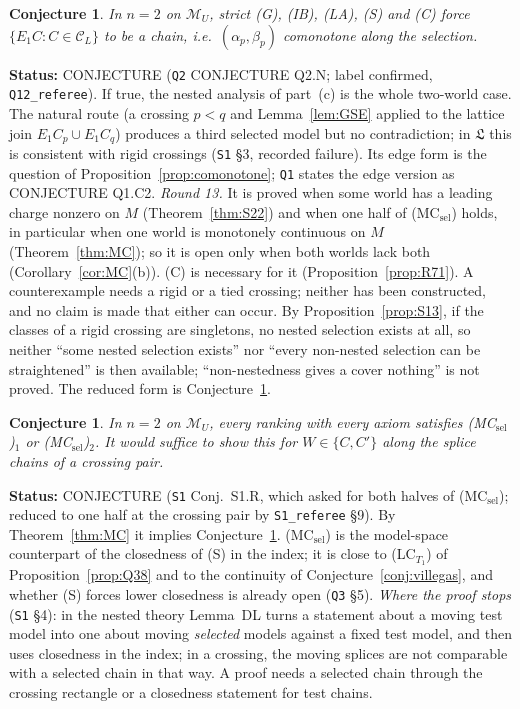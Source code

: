 \documentclass[11pt]{article}
\newtheorem{conjecture}[theorem]{Conjecture}
\theoremstyle{definition}
\theoremstyle{remark}
\newcommand{\M}{\mathcal M}
\newcommand{\C}{\mathcal C}
\newcommand{\src}[1]{\texttt{#1}}
\newcommand{\status}[1]{\par\smallskip\noindent\textbf{Status:} #1\par\smallskip}
\begin{document}
\begin{conjecture}\label{conj:Q2N}
In $n=2$ on $\M_U$, strict (G), (IB), (LA), (S) and (C) force $\{E_1C:C\in\C_L\}$ to be a chain, i.e.\ $(\alpha_p,\beta_p)$ comonotone along the selection.
\end{conjecture}
\status{CONJECTURE (\src{Q2} CONJECTURE Q2.N; label confirmed, \src{Q12\_referee}). If true, the nested analysis of part~(c) is the whole two-world case. The natural route (a crossing $p<q$ and Lemma~\ref{lem:GSE} applied to the lattice join $E_1C_p\cup E_1C_q$) produces a third selected model but no contradiction; in $\mathfrak L$ this is consistent with rigid crossings (\src{S1} \S3, recorded failure). Its edge form is the question of Proposition~\ref{prop:comonotone}; \src{Q1} states the edge version as CONJECTURE Q1.C2. \emph{Round 13.} It is proved when some world has a leading charge nonzero on $M$ (Theorem~\ref{thm:S22}) and when one half of (MC$_{\mathrm{sel}}$) holds, in particular when one world is monotonely continuous on $M$ (Theorem~\ref{thm:MC}); so it is open only when both worlds lack both (Corollary~\ref{cor:MC}(b)). (C) is necessary for it (Proposition~\ref{prop:R71}). A counterexample needs a rigid or a tied crossing; neither has been constructed, and no claim is made that either can occur. By Proposition~\ref{prop:S13}, if the classes of a rigid crossing are singletons, no nested selection exists at all, so neither ``some nested selection exists'' nor ``every non-nested selection can be straightened'' is then available; ``non-nestedness gives a cover nothing'' is not proved. The reduced form is Conjecture~\ref{conj:S1R}.}

\begin{conjecture}\label{conj:S1R}
In $n=2$ on $\M_U$, every ranking with every axiom satisfies (MC$_{\mathrm{sel}}$)$_1$ or (MC$_{\mathrm{sel}}$)$_2$. It would suffice to show this for $W\in\{C,C'\}$ along the splice chains of a crossing pair.
\end{conjecture}
\status{CONJECTURE (\src{S1} Conj.~S1.R, which asked for both halves of (MC$_{\mathrm{sel}}$); reduced to one half at the crossing pair by \src{S1\_referee} \S9). By Theorem~\ref{thm:MC} it implies Conjecture~\ref{conj:Q2N}. (MC$_{\mathrm{sel}}$) is the model-space counterpart of the closedness of (S) in the index; it is close to (LC$_{T_1}$) of Proposition~\ref{prop:Q38} and to the continuity of Conjecture~\ref{conj:villegas}, and whether (S) forces lower closedness is already open (\src{Q3} \S5). \emph{Where the proof stops} (\src{S1} \S4): in the nested theory Lemma~DL turns a statement about a moving test model into one about moving \emph{selected} models against a fixed test model, and then uses closedness in the index; in a crossing, the moving splices are not comparable with a selected chain in that way. A proof needs a selected chain through the crossing rectangle or a closedness statement for test chains.}
\end{document}
